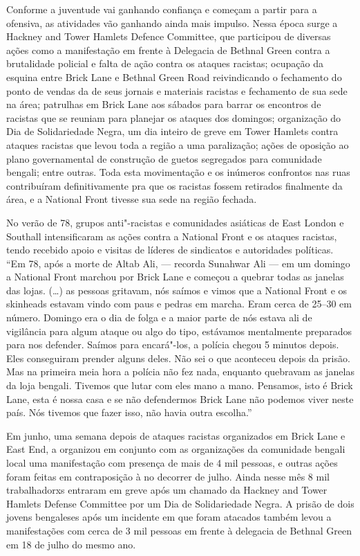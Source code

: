 Conforme a juventude vai ganhando confiança e começam a partir para a ofensiva, as atividades vão ganhando ainda mais impulso. Nessa época surge a Hackney and Tower Hamlets Defence Committee, que participou de diversas ações como a manifestação em frente à Delegacia de Bethnal Green contra a brutalidade policial e falta de ação contra os ataques racistas; ocupação da esquina entre Brick Lane e Bethnal Green Road reivindicando o fechamento do ponto de vendas da  de seus jornais e materiais racistas e fechamento de sua sede na área; patrulhas em Brick Lane aos sábados para barrar os encontros de racistas que se reuniam para planejar os ataques dos domingos; organização do Dia de Solidariedade Negra, um dia inteiro de greve em Tower Hamlets contra ataques racistas que levou toda a região a uma paralização; ações de oposição ao plano governamental de construção de guetos segregados para comunidade bengali; entre outras. Toda esta movimentação e os inúmeros confrontos nas ruas contribuíram definitivamente pra que os racistas fossem retirados finalmente da área, e a National Front tivesse sua sede na região fechada.

No verão de 78, grupos anti"-racistas e comunidades asiáticas de East London e Southall intensificaram as ações contra a National Front e os ataques racistas, tendo recebido apoio e visitas de líderes de sindicatos e autoridades políticas. ``Em 78, após a morte de Altab Ali, --- recorda Sunahwar Ali --- em um domingo a National Front marchou por Brick Lane e começou a quebrar todas as janelas das lojas. (\ldots{}) as pessoas gritavam, nós saímos e vimos que a National Front e os skinheads estavam vindo com paus e pedras em marcha. Eram cerca de 25--30 em número. Domingo era o dia de folga e a maior parte de nós estava ali de vigilância para algum ataque ou algo do tipo, estávamos mentalmente preparados para nos defender. Saímos para encará"-los, a polícia chegou 5 minutos depois. Eles conseguiram prender alguns deles. Não sei o que aconteceu depois da prisão. Mas na primeira meia hora a polícia não fez nada, enquanto quebravam as janelas da loja bengali. Tivemos que lutar com eles mano a mano. Pensamos, isto é Brick Lane, esta é nossa casa e se não defendermos Brick Lane não podemos viver neste país. Nós tivemos que fazer isso, não havia outra escolha.''

Em junho, uma semana depois de ataques racistas organizados em Brick Lane e East End, a  organizou em conjunto com as organizações da comunidade bengali local uma manifestação com presença de mais de 4 mil pessoas, e outras ações foram feitas em contraposição à  no decorrer de julho. Ainda nesse mês 8 mil trabalhadorxs entraram em greve após um chamado da Hackney and Tower Hamlets Defense Committee por um Dia de Solidariedade Negra. A prisão de dois jovens bengaleses após um incidente em que foram atacados também levou a manifestações com cerca de 3 mil pessoas em frente à delegacia de Bethnal Green em 18 de julho do mesmo ano.

